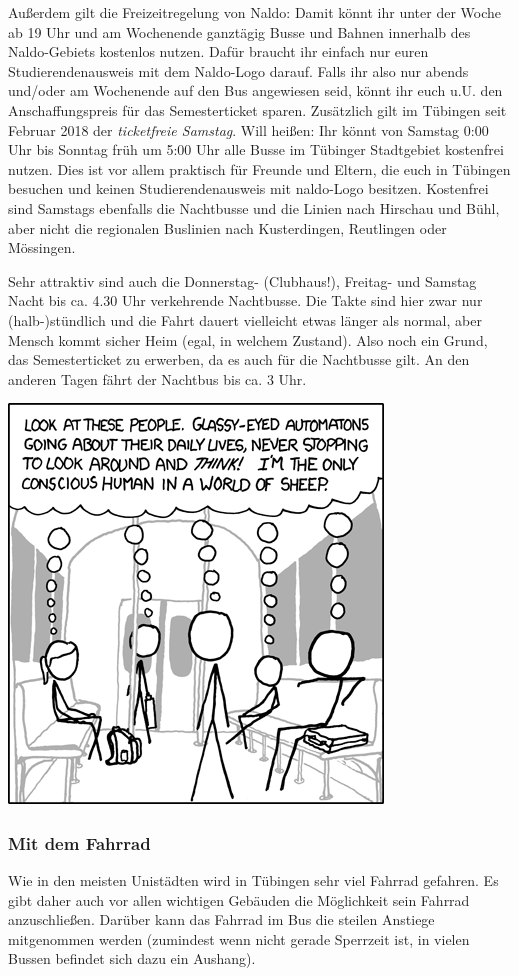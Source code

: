 Außerdem gilt die Freizeitregelung von Naldo: Damit könnt ihr unter der Woche ab 19 Uhr und am Wochenende ganztägig
Busse und Bahnen innerhalb des Naldo-Gebiets kostenlos nutzen. Dafür braucht ihr einfach nur euren Studierendenausweis
mit dem Naldo-Logo darauf. Falls ihr also nur abends und/oder am Wochenende auf den Bus angewiesen seid, könnt ihr
euch u.U. den Anschaffungspreis für das Semesterticket sparen.
Zusätzlich gilt im Tübingen seit Februar 2018 der \emph{ticketfreie Samstag}. Will heißen: Ihr könnt von Samstag
0:00 Uhr bis Sonntag früh um 5:00 Uhr alle Busse im Tübinger Stadtgebiet kostenfrei nutzen. Dies ist vor allem praktisch
für Freunde und Eltern, die euch in Tübingen besuchen und keinen Studierendenausweis mit naldo-Logo besitzen.
Kostenfrei sind Samstags ebenfalls die Nachtbusse und die Linien nach Hirschau und Bühl, aber nicht die regionalen
Buslinien nach Kusterdingen, Reutlingen oder Mössingen.

Sehr attraktiv sind auch die Donnerstag- (Clubhaus!), Freitag- und Samstag Nacht bis ca. 4.30 Uhr verkehrende Nachtbusse.  Die Takte sind hier zwar nur (halb-)stündlich und die Fahrt dauert vielleicht etwas länger als normal, aber Mensch kommt sicher Heim (egal, in welchem Zustand).  Also noch ein Grund, das Semesterticket zu erwerben, da es auch für die Nachtbusse gilt. An den anderen Tagen fährt der Nachtbus bis ca. 3 Uhr.

\begin{center}
\includegraphics[width=0.5\hsize]{shared/xkcd/sheeple.png}
\end{center}

\subsubsection*{Mit dem Fahrrad}
Wie in den meisten Unistädten wird in Tübingen sehr viel Fahrrad gefahren. Es gibt daher auch vor allen wichtigen Gebäuden die Möglichkeit sein Fahrrad anzuschließen. Darüber kann das Fahrrad im Bus die steilen Anstiege mitgenommen werden (zumindest wenn nicht gerade Sperrzeit ist, in vielen Bussen befindet sich dazu ein Aushang).

